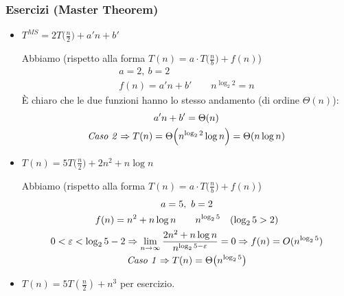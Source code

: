 \subsubsection{Esercizi (Master Theorem)}
\begin{itemize}[label=$\bullet$]
    \item $T^{MS} = 2T\big(\frac{n}{2}\big) + a'n + b'$ \par
    Abbiamo (rispetto alla forma $T(n) = a \cdot T\big(\frac{n}{b}\big) + f(n)$)
    \begin{gather*}
        a = 2, \ b = 2 \\
        f(n) = a'n + b' \qquad n^{\log_2 2} = n
    \end{gather*}
    È chiaro che le due funzioni hanno lo stesso andamento (di ordine $\Theta(n)$):
    \begin{gather*}
        a'n + b' = \Theta (n) \\
        \text{\emph{Caso 2}} \Rightarrow T(n) = \Theta \Big(n^{\log_2 2} \log n \Big) = \Theta (n \log n)
    \end{gather*}

    \item $T(n) = 5T\big( \frac{n}{2} \big) + 2n^2 + n \log n$ \par
    Abbiamo (rispetto alla forma $T(n) = a \cdot T\big(\frac{n}{b}\big) + f(n)$)
    \begin{gather*}
        a = 5, \ b = 2 \\
        f(n) = n^2 + n \log n \qquad n^{\log_2 5} \quad (\log_2 5 > 2) \\
        0 < \varepsilon < \log_2 5 - 2 \Rightarrow 
            \lim_{n \to \infty} \frac{2n^2 + n \log n}{n^{\log_2 5 - \varepsilon}} = 0 
            \Rightarrow f(n) = O(n^{\log_2 5}) \\
        \text{\emph{Caso 1}} \Rightarrow T(n) = \Theta \big( n^{\log_2 5} \big)
    \end{gather*}

    \item $T(n) = 5T(\frac{n}{2}) + n^3$ per esercizio.


\end{itemize}
